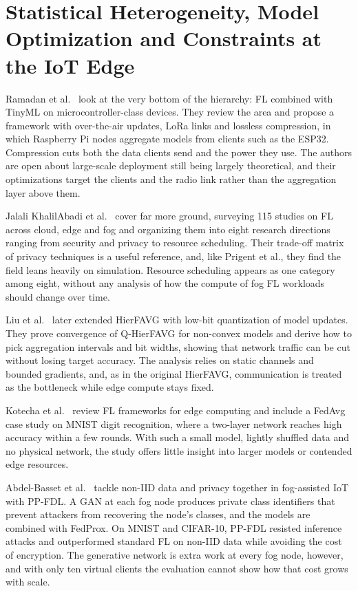 \section{Statistical Heterogeneity, Model Optimization and Constraints at the IoT Edge}\label{sec:lit-heterogeneity}

Ramadan et al.~\cite{ramadan2025tinyml} look at the very bottom of the hierarchy: \ac{FL} combined with TinyML on microcontroller-class devices. They review the area and propose a framework with over-the-air updates, LoRa links and lossless compression, in which Raspberry Pi nodes aggregate models from clients such as the ESP32. Compression cuts both the data clients send and the power they use. The authors are open about large-scale deployment still being largely theoretical, and their optimizations target the clients and the radio link rather than the aggregation layer above them.

Jalali KhalilAbadi et al.~\cite{jalali2026cef} cover far more ground, surveying 115 studies on \ac{FL} across cloud, edge and fog and organizing them into eight research directions ranging from security and privacy to resource scheduling. Their trade-off matrix of privacy techniques is a useful reference, and, like Prigent et al., they find the field leans heavily on simulation. Resource scheduling appears as one category among eight, without any analysis of how the compute of fog \ac{FL} workloads should change over time.

Liu et al.~\cite{liu2023quantization} later extended \ac{HierFAVG} with low-bit quantization of model updates. They prove convergence of Q-HierFAVG for non-convex models and derive how to pick aggregation intervals and bit widths, showing that network traffic can be cut without losing target accuracy. The analysis relies on static channels and bounded gradients, and, as in the original \ac{HierFAVG}, communication is treated as the bottleneck while edge compute stays fixed.

Kotecha et al.~\cite{kotecha2024performance} review \ac{FL} frameworks for edge computing and include a FedAvg case study on MNIST digit recognition, where a two-layer network reaches high accuracy within a few rounds. With such a small model, lightly shuffled data and no physical network, the study offers little insight into larger models or contended edge resources.

Abdel-Basset et al.~\cite{abdelbasset2024ppfdl} tackle non-\ac{IID} data and privacy together in fog-assisted \ac{IoT} with \ac{PP-FDL}. A \ac{GAN} at each fog node produces private class identifiers that prevent attackers from recovering the node's classes, and the models are combined with FedProx. On MNIST and CIFAR-10, \ac{PP-FDL} resisted inference attacks and outperformed standard \ac{FL} on non-\ac{IID} data while avoiding the cost of encryption. The generative network is extra work at every fog node, however, and with only ten virtual clients the evaluation cannot show how that cost grows with scale.


